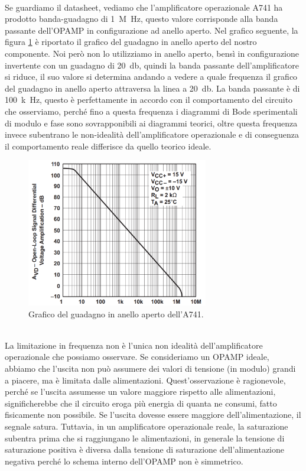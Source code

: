 \documentclass{report}
\begin{document}
\\Se guardiamo il datasheet, vediamo che l'amplificatore operazionale \textmu A741 ha prodotto banda-guadagno di \SI{1}{M\hertz}, questo valore corrisponde alla banda passante dell'OPAMP in configurazione ad anello aperto. Nel grafico seguente, la figura \ref{figura:bandaguad} è riportato il grafico del guadagno in anello aperto del nostro componente. Noi però non lo utilizziamo in anello aperto, bensì in configurazione invertente con un guadagno di \SI{20}{\decibel}, quindi la banda passante dell'amplificatore si riduce, il suo valore si determina andando a vedere a quale frequenza il grafico del guadagno in anello aperto attraversa la linea a \SI{20}{\decibel}. La banda passante è di \SI{100}{k\hertz}, questo è perfettamente in accordo con il comportamento del circuito che osserviamo, perché fino a questa frequenza i diagrammi di Bode sperimentali di modulo e fase sono sovrapponibili ai diagrammi teorici, oltre questa frequenza invece subentrano le non-idealità dell'amplificatore operazionale e di conseguenza il comportamento reale differisce da quello teorico ideale.
\begin{figure}[h!]
	\centering
	\includegraphics[height=6.5cm]{immagini/gbw}
	\caption{Grafico del guadagno in anello aperto dell'\textmu A741.}
	\label{figura:bandaguad}
\end{figure}
\\La limitazione in frequenza non è l'unica non idealità dell'amplificatore operazionale che possiamo osservare. Se consideriamo un OPAMP ideale, abbiamo che l'uscita non può assumere dei valori di tensione (in modulo) grandi a piacere, ma è limitata dalle alimentazioni. Quest'osservazione è ragionevole, perché se l'uscita assumesse un valore maggiore rispetto alle alimentazioni, significherebbe che il circuito eroga più energia di quanta ne consumi, fatto fisicamente non possibile. Se l'uscita dovesse essere maggiore dell'alimentazione, il segnale satura. Tuttavia, in un amplificatore operazionale reale, la saturazione subentra prima che si raggiungano le alimentazioni, in generale la tensione di saturazione positiva è diversa dalla tensione di saturazione dell'alimentazione negativa perché lo schema interno dell'OPAMP non è simmetrico. \par %
\end{document}
